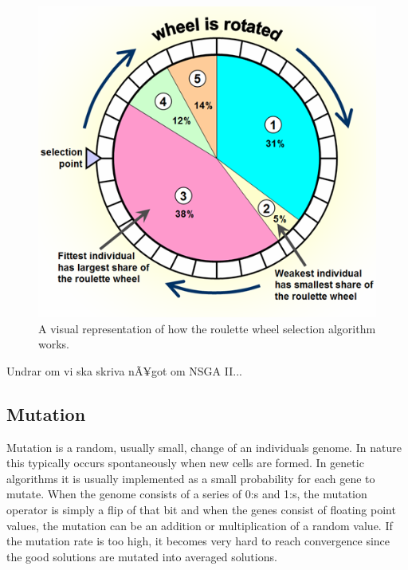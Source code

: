 \documentclass[a4paper,11pt]{kth-mag}
\begin{document}
\begin{figure}
\centering\includegraphics[scale=0.9]{roulettewheel.png}
\caption{A visual representation of how the roulette wheel selection algorithm works.}
\label{roulettewheelpic}
\end{figure}

Undrar om vi ska skriva nÃ¥got om NSGA II...
 
\subsection{Mutation}
Mutation is a random, usually small, change of an individuals genome. In nature this typically occurs spontaneously when new cells are formed. In genetic algorithms it is usually implemented as a small probability for each gene to mutate. When the genome consists of a series of 0:s and 1:s, the mutation operator is simply a flip of that bit and when the genes consist of floating point values, the mutation can be an addition or multiplication of a random value. If the mutation rate is too high, it becomes very hard to reach convergence since the good solutions are mutated into averaged solutions.
\end{document}

